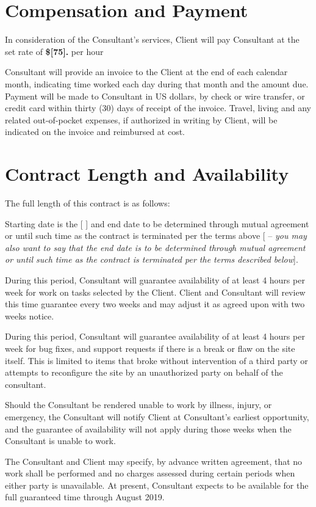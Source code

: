 \documentclass[10pt]{article}
\begin{document}
\section{Compensation and Payment}

In consideration of the Consultant's services, Client will pay
Consultant at the set rate of {\bf \$[75].} per hour

Consultant will provide an invoice to the Client at the end of each calendar
month, indicating time worked each day during that month and the
amount due.  Payment will be made to Consultant in US dollars, by check or
wire transfer, or credit card within thirty (30) days of receipt of the invoice.  Travel,
living and any related out-of-pocket expenses, if authorized in writing by
Client, will be indicated on the invoice and reimbursed at cost.


\section{Contract Length and Availability}

The full length of this contract is as follows:

Starting date is the [      ] and end date to be determined through mutual agreement or until such time as the contract is terminated per the terms above [     -- {\em you may also want to say that the end date is to be determined through mutual agreement or until such time as the contract is terminated per the terms described below}].

During this period, Consultant will guarantee availability of at least 4
hours per week for work on tasks selected by the Client.  Client and
Consultant will review this time guarantee every two weeks and may adjust it
as agreed upon with two weeks notice.

During this period, Consultant will guarantee availability of at least 4
hours per week for bug fixes, and support requests if there is a break or flaw on the site itself.
This is limited to items that broke without intervention of a third party or attempts to reconfigure the site
by an unauthorized party on behalf of the consultant.  

Should the Consultant be rendered unable to work by illness, injury, or
emergency, the Consultant will notify Client at Consultant's earliest
opportunity, and the guarantee of availability will not apply during those
weeks when the Consultant is unable to work.

The Consultant and Client may specify, by advance written agreement, that no
work shall be performed and no charges assessed during certain periods when
either party is unavailable.  At present, Consultant expects to be available
for the full guaranteed time through August 2019. 
\end{document}
